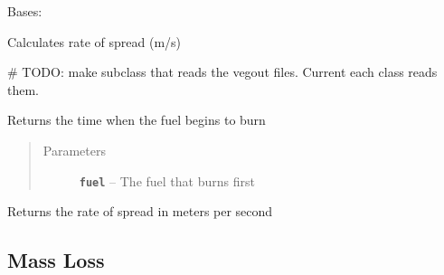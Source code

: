 \documentclass[letterpaper,10pt,english]{sphinxmanual}
\begin{document}
\begin{fulllineitems}
\label{metrics_ROS:metrics.ROS}
Bases: 

Calculates rate of spread (m/s)

\# TODO: make subclass that reads the vegout files. Current each class reads them.

\begin{fulllineitems}
\label{metrics_ROS:metrics.ROS.get_first_burn_time}
Returns the time when the fuel begins to burn
\begin{quote}\begin{description}
\item[{Parameters}] \leavevmode
\textbf{\texttt{fuel}} -- The fuel that burns first

\end{description}\end{quote}

\end{fulllineitems}


\begin{fulllineitems}
\label{metrics_ROS:metrics.ROS.get_ros}
Returns the rate of spread in meters per second

\end{fulllineitems}


\end{fulllineitems}



\subsection{Mass Loss}
\label{metrics_MassLoss:mass-loss}\label{metrics_MassLoss::doc}
\end{document}
